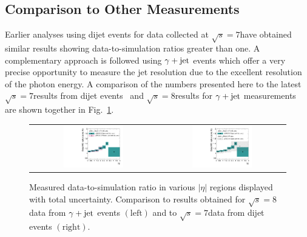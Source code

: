 \subsection{Comparison to Other Measurements}
\label{subsec:jer_results_comparison}
Earlier analyses using dijet events for data collected at $\sqrt{s}=7$\tev have obtained similar results showing data-to-simulation ratios greater than one. A complementary approach is followed using $\gamma +\rm{jet}$ events which offer a very precise opportunity to measure the jet resolution due to the excellent resolution of the photon energy. A comparison of the numbers presented here to the latest $\sqrt{s}=7$\tev results from dijet events~\cite{thesis:Schroeder} and $\sqrt{s}=8$\tev results for $\gamma +\rm{jet}$ measurements~\cite{CMS-AN-2013-179} are shown together in Fig.~\ref{fig:result_comparison}.

\begin{figure}[!hp]
  \centering
  \begin{tabular}{cc}
                \includegraphics[width=0.49\textwidth]{figures/JER_2012_compPhoton_final_combination_v1.pdf} &
                \includegraphics[width=0.49\textwidth]{figures/JER_2012_comp2011_final_combination_v1.pdf}
  \end{tabular}
  \caption{Measured data-to-simulation ratio in various $|\eta|$ regions displayed with total uncertainty. Comparison to results obtained for $\sqrt{s}=8$\tev data from $\gamma +\rm{jet}$ events $(\mathrm{left})$ and to $\sqrt{s}=7$\tev data from dijet events $(\mathrm{right})$.}
  \label{fig:result_comparison}
\end{figure}

